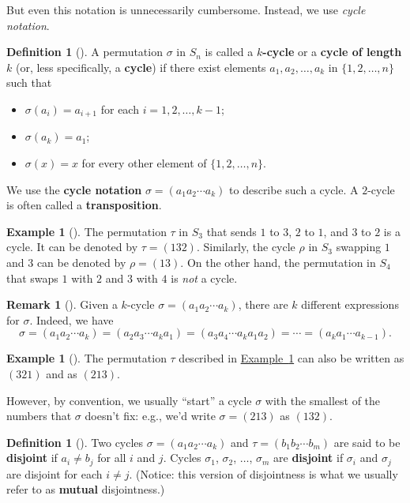 \documentclass[10pt,]{book}
\newcommand{\terminology}[1]{\textbf{#1}}
\theoremstyle{plain}
\theoremstyle{definition}
\newtheorem{definition}[theorem]{Definition}
\theoremstyle{definition}
\newtheorem{remark}[theorem]{Remark}
\theoremstyle{definition}
\newtheorem{example}[theorem]{Example}
\theoremstyle{definition}
\numberwithin{equation}{section}
\begin{document}
But even this notation is unnecessarily cumbersome. Instead, we use \emph{cycle notation}.%
\begin{definition}[{}]\label{definition-46}
A permutation \(\sigma\) in \(S_n\) is called a \terminology{\(k\)-cycle} or a \terminology{cycle of length \(k\)} (or, less specifically, a \terminology{cycle}) if there exist elements \(a_1,
a_2,\ldots, a_k\) in \(\{1,2,\ldots,n\}\) such that \leavevmode%
\begin{itemize}[label=\textbullet]
\item{}\(\sigma(a_i)=a_{i+1}\) for each \(i=1,2,\ldots, k-1\);%
\item{}\(\sigma(a_k)=a_1\);%
\item{}\(\sigma(x)=x\) for every other element of \(\{1,2,\ldots, n\}\).%
\end{itemize}
%
\par
We use the \terminology{cycle notation} \(\sigma = (a_1 a_2 \cdots a_k)\) to describe such a cycle. A \(2\)-cycle is often called a \terminology{transposition}.%
\end{definition}
\begin{example}[]\label{tr}
The permutation \(\tau\) in \(S_3\) that sends \(1\) to \(3\), \(2\) to \(1\), and \(3\) to \(2\) is a cycle. It can be denoted by \(\tau =(132)\). Similarly, the cycle \(\rho\) in \(S_3\) swapping \(1\) and \(3\) can be denoted by \(\rho=(13)\). On the other hand, the permutation in \(S_4\) that swaps \(1\) with \(2\) and \(3\) with \(4\) is \emph{not} a cycle.%
\end{example}
\begin{remark}[]\label{remark-25}
Given a \(k\)-cycle \(\sigma=(a_1 a_2\cdots a_k)\), there are \(k\) different expressions for \(\sigma\). Indeed, we have%
\begin{equation*}
\sigma=(a_1 a_2\cdots a_k)=(a_2 a_3 \cdots a_k a_1)=(a_3 a_4 \cdots a_k a_1 a_2)=\cdots = (a_k a_1 \cdots a_{k-1}).
\end{equation*}
%
\end{remark}
\begin{example}[]\label{example-52}
The permutation \(\tau\) described in \hyperref[tr]{Example~\ref{tr}} can also be written as \((321)\) and as \((213)\).%
\end{example}
However, by convention, we usually ``start'' a cycle \(\sigma\) with the smallest of the numbers that \(\sigma\) doesn't fix: e.g., we'd write \(\sigma=(213)\) as \((132)\).%
\begin{definition}[{}]\label{definition-47}
Two cycles \(\sigma=(a_1 a_2 \cdots a_k)\) and \(\tau=(b_1
b_2 \cdots b_m)\) are said to be \terminology{disjoint} if \(a_i \neq
b_j\) for all \(i\) and \(j\). Cycles \(\sigma_1\), \(\sigma_2\), \(\ldots\), \(\sigma_m\) are \terminology{disjoint} if \(\sigma_i\) and \(\sigma_j\) are disjoint for each \(i \neq j\). (Notice: this version of disjointness is what we usually refer to as \terminology{mutual} disjointness.)%
\end{definition}
\end{document}

